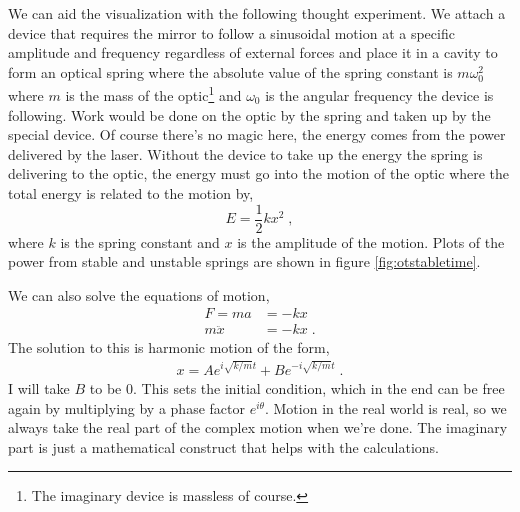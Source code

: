 We can aid the visualization with the following thought experiment.
We attach a device that requires the mirror to follow a
sinusoidal motion at a specific amplitude and frequency regardless of external
forces and place it in a cavity to form an optical spring where the absolute
value of the spring constant is $m\omega_0^2$ where $m$ is the mass of the
optic\footnote{The imaginary device is massless of course.} and $\omega_0$
is the angular frequency the device is following.
Work would be done on the optic by the spring and taken up by the special device.
Of course there's no magic here, the energy comes from the power delivered by
the laser.
Without the device to take up the energy the spring is delivering to
the optic, the energy must go into the motion of the optic where the total
energy is related to the motion by,
\begin{equation}
E = \frac{1}{2}kx^2 \;,
\end{equation}
where $k$ is the spring constant and $x$ is the amplitude of the motion.
Plots of the power from stable and unstable springs are shown in figure
\ref{fig:otstabletime}.

We can also solve the equations of motion,
\begin{align*}
F = ma &= -kx \\
  m\ddot x &= -kx\;.
\end{align*}
The solution to this is harmonic motion of the form,
\begin{align*}
x = Ae^{i\sqrt{k/m}t} + Be^{-i\sqrt{k/m}t} \;.
\end{align*}
I will take $B$ to be $0$. This sets the initial condition, which in the
end can be free again by multiplying by a phase factor $e^{i\theta}$.
Motion in the real world is real, so we always take the real part of the
complex motion when we're done. The imaginary part is just a mathematical
construct that helps with the calculations.

